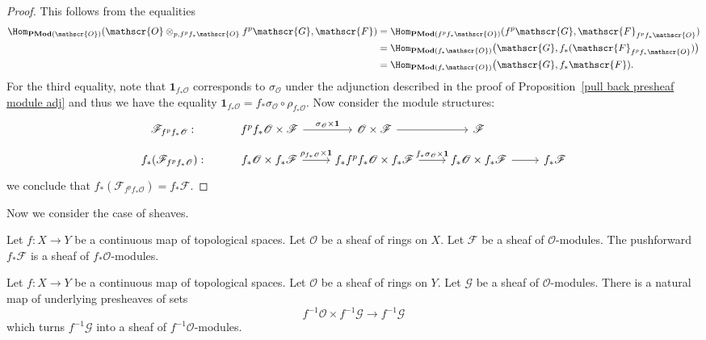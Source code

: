 \begin{proof}
This follows from the equalities
\begin{align*}
\Hom_{\mathbf{PMod}(\mathscr{O})}(\mathscr{O}\otimes_{p,f^pf_*\mathscr{O}}f^p\mathscr{G},\mathscr{F})&=\Hom_{\mathbf{PMod}(f^pf_*\mathscr{O})}(f^p\mathscr{G},\mathscr{F}_{f^pf_*\mathscr{O}})\\
&=\Hom_{\mathbf{PMod}(f_*\mathscr{O})}\big(\mathscr{G},f_*(\mathscr{F}_{f^pf_*\mathscr{O}})\big)\\
&=\Hom_{\mathbf{PMod}(f_*\mathscr{O})}\big(\mathscr{G},f_*\mathscr{F}).
\end{align*}
For the third equality, note that $\mathbf{1}_{f_*\mathscr{O}}$ corresponds to $\sigma_{\mathscr{O}}$ under the adjunction described in the proof of Proposition~\ref{pull back presheaf module adj} and thus we have the equality $\mathbf{1}_{f_*\mathscr{O}}=f_*\sigma_{\mathscr{O}}\circ\rho_{f_*\mathscr{O}}$. Now consider the module structures:
\[\begin{tikzcd}[row sep=small]
\mathscr{F}_{f^pf_*\mathscr{O}}:&f^pf_*\mathscr{O}\times\mathscr{F}\ar[r,"\sigma_{\mathscr{O}}\times\mathbf{1}"]&\mathscr{O}\times\mathscr{F}\ar[r]&\mathscr{F}\\
f_*(\mathscr{F}_{f^pf_*\mathscr{O}}):&f_*\mathscr{O}\times f_*\mathscr{F}\ar[r,"\rho_{f_*\mathscr{O}}\times\mathbf{1}"]&f_*f^pf_*\mathscr{O}\times f_*\mathscr{F}\ar[r,"f_*\sigma_{\mathscr{O}}\times\mathbf{1}"]&f_*\mathscr{O}\times f_*\mathscr{F}\ar[r]&f_*\mathscr{F}
\end{tikzcd}\]
we conclude that $f_*(\mathscr{F}_{f^pf_*\mathscr{O}})=f_*\mathscr{F}$.
\end{proof}
Now we consider the case of sheaves.
\begin{lemma}\label{pushforward sheaf module def}
Let $f:X\to Y$ be a continuous map of topological spaces. Let $\mathscr{O}$ be a sheaf of rings on $X$. Let $\mathscr{F}$ be a sheaf of $\mathscr{O}$-modules. The pushforward $f_*\mathscr{F}$ is a sheaf of $f_*\mathscr{O}$-modules.
\end{lemma}
\begin{lemma}\label{pull back module def}
Let $f:X\to Y$ be a continuous map of topological spaces. Let $\mathscr{O}$ be a sheaf of rings on $Y$. Let $\mathscr{G}$ be a sheaf of $\mathscr{O}$-modules. There is a natural map of underlying presheaves of sets
\[f^{-1}\mathscr{O}\times f^{-1}\mathscr{G}\to f^{-1}\mathscr{G}\]
which turns $f^{-1}\mathscr{G}$ into a sheaf of $f^{-1}\mathscr{O}$-modules.
\end{lemma}
